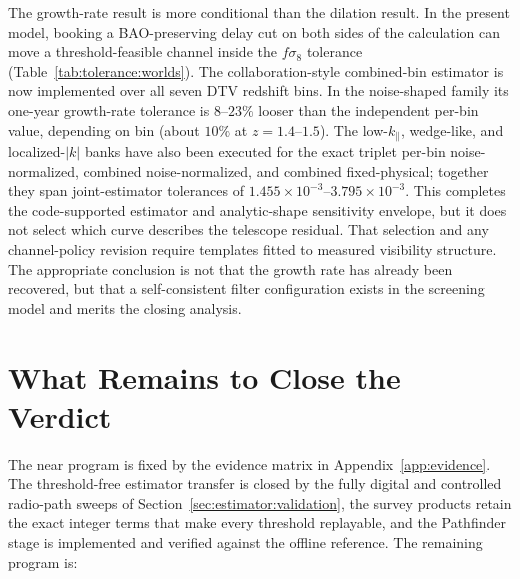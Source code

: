 

The growth-rate result is more conditional than the dilation result.  In the
present model, booking a BAO-preserving delay cut on both sides of the calculation
can move a threshold-feasible channel inside the $f\sigma_8$ tolerance (Table~\ref{tab:tolerance:worlds}).  The
collaboration-style combined-bin estimator is now implemented over all seven
DTV redshift bins.  In the noise-shaped family its one-year growth-rate
tolerance is $8$--$23\%$ looser than the independent per-bin value, depending
on bin (about $10\%$ at $z=1.4$--$1.5$).  The low-$k_\parallel$, wedge-like,
and localized-$|k|$ banks have also been executed for the exact triplet
per-bin noise-normalized, combined noise-normalized, and combined
fixed-physical; together they span joint-estimator tolerances
of $1.455\times10^{-3}$--$3.795\times10^{-3}$.  This completes the
code-supported estimator and analytic-shape sensitivity envelope, but it does
not select which curve describes the telescope residual.  That selection and
any channel-policy revision require templates fitted to measured visibility
structure.  The
appropriate conclusion is not that the growth rate has already been recovered,
but that a self-consistent filter configuration exists in the screening model
and merits the closing analysis.

\section{What Remains to Close the Verdict}
\label{sec:conclusions:future}

The near program is fixed by the evidence matrix in Appendix~\ref{app:evidence}.
The threshold-free estimator transfer is closed by the fully digital and
controlled radio-path sweeps of Section~\ref{sec:estimator:validation}, the
survey products retain the exact integer terms that make every threshold
replayable, and the Pathfinder stage is implemented and verified against the
offline reference.  The remaining program is:


